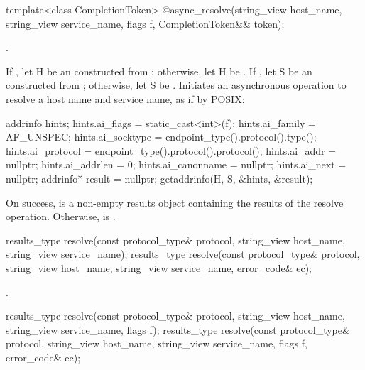\begin{itemdecl}
template<class CompletionToken>
  @\DEDUCED@ async_resolve(string_view host_name, string_view service_name,
                        flags f, CompletionToken&& token);
\end{itemdecl}

\begin{itemdescr}
\pnum
\completionsig {}.

\pnum
\effects If , let H be an \ntbs constructed from ; otherwise, let H be . If , let S be an \ntbs constructed from ; otherwise, let S be . Initiates an asynchronous operation to resolve a host name and service name, as if by POSIX:
\begin{codeblock}
addrinfo hints;
hints.ai_flags = static_cast<int>(f);
hints.ai_family = AF_UNSPEC;
hints.ai_socktype = endpoint_type().protocol().type();
hints.ai_protocol = endpoint_type().protocol().protocol();
hints.ai_addr = nullptr;
hints.ai_addrlen = 0;
hints.ai_canonname = nullptr;
hints.ai_next = nullptr;
addrinfo* result = nullptr;
getaddrinfo(H, S, &hints, &result);
\end{codeblock}
 On success,  is a non-empty results object containing the results of the resolve operation. Otherwise,  is .
\end{itemdescr}

\begin{itemdecl}
results_type resolve(const protocol_type& protocol,
                     string_view host_name, string_view service_name);
results_type resolve(const protocol_type& protocol,
                     string_view host_name, string_view service_name,
                     error_code& ec);
\end{itemdecl}

\begin{itemdescr}
\pnum
\returns {}.
\end{itemdescr}

\begin{itemdecl}
results_type resolve(const protocol_type& protocol,
                     string_view host_name, string_view service_name,
                     flags f);
results_type resolve(const protocol_type& protocol,
                     string_view host_name, string_view service_name,
                     flags f, error_code& ec);
\end{itemdecl}

